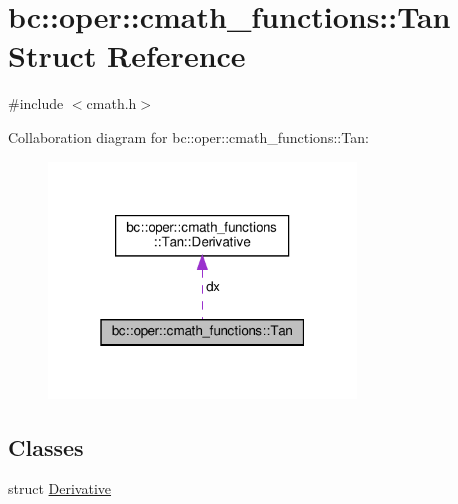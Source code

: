 \hypertarget{structbc_1_1oper_1_1cmath__functions_1_1Tan}{}\section{bc\+:\+:oper\+:\+:cmath\+\_\+functions\+:\+:Tan Struct Reference}
\label{structbc_1_1oper_1_1cmath__functions_1_1Tan}


{\ttfamily \#include $<$cmath.\+h$>$}



Collaboration diagram for bc\+:\+:oper\+:\+:cmath\+\_\+functions\+:\+:Tan\+:\nopagebreak
\begin{figure}[H]
\begin{center}
\leavevmode
\includegraphics[width=232pt]{structbc_1_1oper_1_1cmath__functions_1_1Tan__coll__graph}
\end{center}
\end{figure}
\subsection*{Classes}
\begin{DoxyCompactItemize}
\item 
struct \hyperlink{structbc_1_1oper_1_1cmath__functions_1_1Tan_1_1Derivative}{Derivative}
\end{DoxyCompactItemize}
